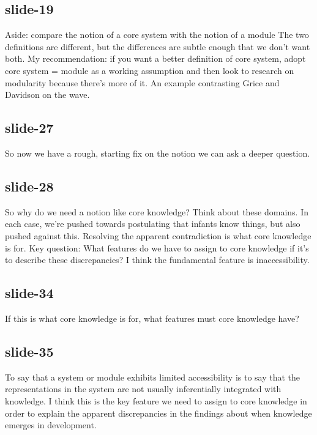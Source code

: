 \documentclass[12pt,\papersize]{extarticle}
\begin{document}
 
\subsection{slide-19}
Aside: compare the notion of a core system with the notion of a module
The two definitions are different, but the differences are subtle enough that we don't want both.
My recommendation: if you want a better definition of core system, adopt core system = module as a working assumption and then look to research on modularity because there's more of it.
An example contrasting Grice and Davidson on the wave.
 
 
\subsection{slide-27}
So now we have a rough, starting fix on the notion we can ask a deeper question.
 
 
\subsection{slide-28}
So why do we need a notion like core knowledge?
Think about these domains.
In each case, we're pushed towards postulating that infants know things, but also pushed against this.
Resolving the apparent contradiction is what core knowledge is for.
Key question: What features do we have to assign to core knowledge if it's to describe these discrepancies?
I think the fundamental feature is inaccessibility.
 
 
\subsection{slide-34}
If this is what core knowledge is for, what features must core knowledge have?
 
 
\subsection{slide-35}
To say that a system or module exhibits limited accessibility is to say that the representations in the system are not usually inferentially integrated with knowledge.
I think this is the key feature we need to assign to core knowledge in order to explain the apparent discrepancies in the findings about when knowledge emerges in development.
 
 
\end{document}
